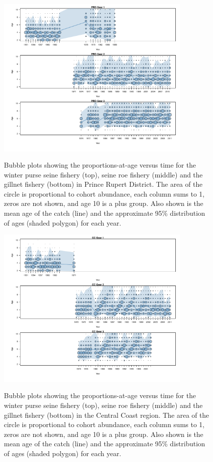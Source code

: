 \begin{figure}
	\centering
	\includegraphics[width=0.85\textwidth]{../Figs/iscam_fig_AgeCompsPRD.pdf}\\
	\caption{Bubble plots showing the proportions-at-age versus time for the winter purse seine fishery (top), seine roe fishery (middle) and the gillnet fishery (bottom) in Prince Rupert District.  The area of the circle is proportional to cohort abundance, each column sums to 1, zeros are not shown, and age 10 is a plus group. Also shown is the mean age of the catch (line) and the approximate 95\% distribution of ages (shaded polygon) for each year.}\label{FigAgeCompsPRD}
\end{figure}

\begin{figure}
	\centering
	\includegraphics[width=0.85\textwidth]{../Figs/iscam_fig_AgeCompsCC.pdf}\\
	\caption{Bubble plots showing the proportions-at-age versus time for the winter purse seine fishery (top), seine roe fishery (middle) and the gillnet fishery (bottom) in the Central Coast region.  The area of the circle is proportional to cohort abundance, each column sums to 1, zeros are not shown, and age 10 is a plus group. Also shown is the mean age of the catch (line) and the approximate 95\% distribution of ages (shaded polygon) for each year.}\label{FigAgeCompsCC}
\end{figure}

